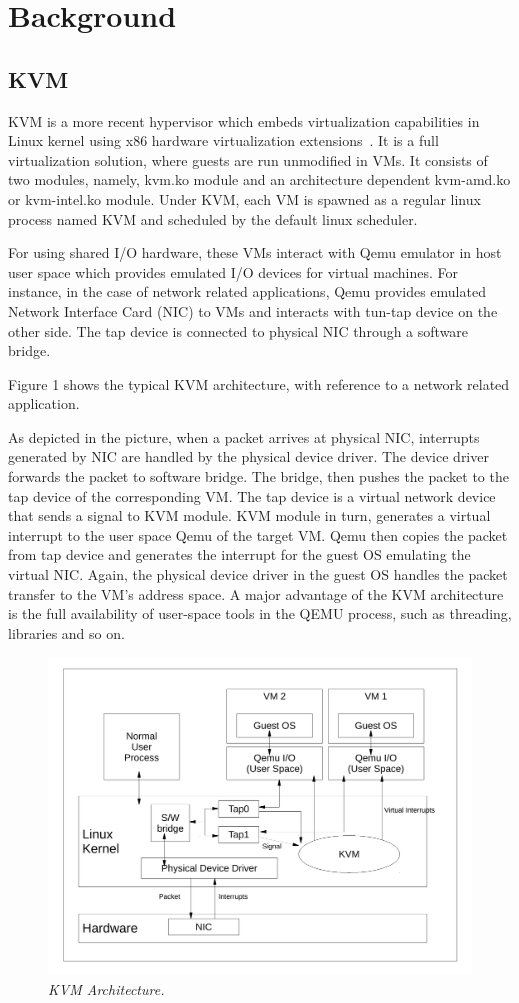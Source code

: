 \section{Background} \label{sec:background}

\subsection{KVM} \label{sec:kvm}

KVM is a more recent hypervisor which embeds virtualization capabilities 
in Linux kernel using x86 hardware virtualization extensions~\cite{kivity2007kvm}. 
It is a full virtualization solution, where guests are run unmodified in VMs. It 
consists of two modules, namely, kvm.ko module and an architecture dependent 
kvm-amd.ko or kvm-intel.ko module. Under KVM, each VM is spawned as a regular linux 
process named KVM and scheduled by the default linux scheduler. 

For using shared I/O hardware, these VMs interact with Qemu emulator in host user 
space which provides emulated I/O devices for virtual machines. For instance, in 
the case of network related applications, Qemu provides emulated Network Interface 
Card (NIC) to VMs and interacts with tun-tap device on the other side. The tap device 
is connected to physical NIC through a software bridge.

Figure 1 shows the typical KVM architecture, with reference to a network related
application. 

As depicted in the picture, when a packet arrives at physical NIC,
interrupts generated by NIC are handled by the physical device driver. The device
driver forwards the packet to software bridge. The bridge, then pushes the packet
to the tap device of the corresponding VM. The tap device is a virtual network
device that sends a signal to KVM module. KVM module in turn, generates a virtual
interrupt to the user space Qemu of the target VM. Qemu then copies the packet from
tap device and generates the interrupt for the guest OS emulating the virtual NIC.
Again, the physical device driver in the guest OS handles the packet transfer to
the VM’s address space. A major advantage of the KVM architecture is the full
availability of user-space tools in the QEMU process, such as threading, libraries
and so on.

\begin{figure}[t]
\centering
\includegraphics[width=.47\textwidth]{figures/kvm}
\vspace{-.2in}
\caption{{\em KVM Architecture.}} \label{fig:kvm}
\vspace{.05in}
\end{figure}

